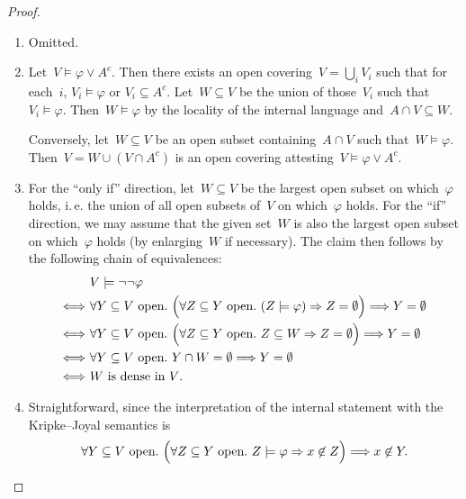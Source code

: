 \documentclass[10pt]{amsart}
\makeatletter
\theoremstyle{definition}
\theoremstyle{plain}
\theoremstyle{remark}
\newcommand{\?}{\,{:}\,}
\renewcommand{\_}{\mathpunct{.}\,}
\newcommand{\ie}{i.\,e.\@\xspace}
\makeatother
\begin{document}
\begin{proof}
\begin{enumerate}
\item Omitted.

\item Let~$V \models \varphi \vee A^c$. Then there exists an open covering~$V =
\bigcup_i V_i$ such that for each~$i$, $V_i \models \varphi$ or $V_i \subseteq
A^c$. Let~$W \subseteq V$ be the union of those~$V_i$ such that~$V_i \models \varphi$.
Then~$W \models \varphi$ by the locality of the internal language and~$A \cap V
\subseteq W$.

Conversely, let~$W \subseteq V$ be an open subset containing~$A \cap V$ such
that~$W \models \varphi$. Then~$V = W \cup (V \cap A^c)$ is an open covering
attesting~$V \models \varphi \vee A^c$.

\item For the ``only if'' direction, let~$W \subseteq V$ be the largest
open subset on which~$\varphi$ holds, \ie the union of all open subsets
of~$V$ on which~$\varphi$ holds. For the ``if'' direction, we may assume that
the given set~$W$ is also the largest open subset on which~$\varphi$ holds (by
enlarging~$W$ if necessary). The claim then follows by the following chain of
equivalences:
\begin{align*}
  &\ V \models \neg\neg\varphi \\
  \Longleftrightarrow&\ \forall \text{$Y \subseteq V$ open}\_
    \Bigl(\forall \text{$Z \subseteq Y$ open}\_ (Z \models \varphi) \Rightarrow Z
    = \emptyset\Bigr) \Longrightarrow Y = \emptyset \\
  \Longleftrightarrow&\ \forall \text{$Y \subseteq V$ open}\_
    \Bigl(\forall \text{$Z \subseteq Y$ open}\_ Z \subseteq W \Rightarrow Z
    = \emptyset\Bigr) \Longrightarrow Y = \emptyset \\
  \Longleftrightarrow&\ \forall \text{$Y \subseteq V$ open}\_
    Y \cap W = \emptyset \Longrightarrow Y = \emptyset \\
  \Longleftrightarrow&\ \text{$W$ is dense in~$V$.}
\end{align*}

\item Straightforward, since the interpretation of the internal statement with
the Kripke--Joyal semantics is
\[ \forall \text{$Y \subseteq V$ open}\_
  \Bigl(\forall \text{$Z \subseteq Y$ open}\_
    Z \models \varphi \Rightarrow x \not\in Z\Bigr) \Longrightarrow x \not\in
    Y. \qedhere \]
\end{enumerate}
\end{proof}
\end{document}

